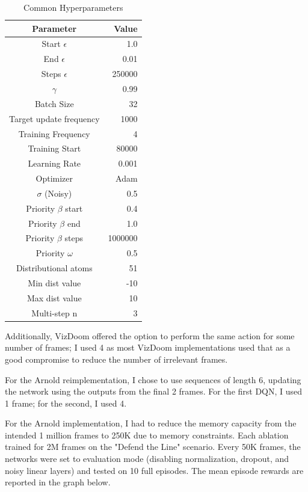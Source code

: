\documentclass[letterpaper]{article}
\begin{document}
	\begin{table}[h]
	\caption{Common Hyperparameters}
	\centering
		\begin{tabular}{c r}
			\hline \hline
			Parameter & Value \\
			\hline
			Start $\epsilon$ & 1.0 \\
			End $\epsilon$ & 0.01  \\
			Steps $\epsilon$ & 250000 \\
			$\gamma$  & 0.99 \\
			Batch Size & 32 \\
			Target update frequency & 1000 \\
			Training Frequency & 4 \\
			Training Start & 80000 \\
			Learning Rate & 0.001 \\
			Optimizer & Adam \\
			$\sigma$ (Noisy) & 0.5 \\
			Priority $\beta$ start & 0.4 \\
			Priority $\beta$ end & 1.0 \\
			Priority $\beta$ steps & 1000000 \\
			Priority $\omega$ & 0.5 \\
			Distributional atoms & 51 \\
			Min dist value & -10 \\
			Max dist value & 10 \\
			Multi-step n & 3 \\
			\hline
		\end{tabular}
	\label{tab:comHyp}
	\end{table}
	
	Additionally, VizDoom offered the option to perform the same action for some number of frames; I used 4 as most VizDoom implementations used that as a good compromise to reduce the number of irrelevant frames.
	
	For the Arnold reimplementation, I chose to use sequences of length 6, updating the network using the outputs from the final 2 frames. For the first DQN, I used 1 frame; for the second, I used 4. 
	
	For the Arnold implementation, I had to reduce the memory capacity from the intended 1 million frames to 250K due to memory constraints. Each ablation trained for 2M frames on the "Defend the Line" scenario. Every 50K frames, the networks were set to evaluation mode (disabling normalization, dropout, and noisy linear layers) and tested on 10 full episodes. The mean episode rewards are reported in the graph below.
	
\end{document}
